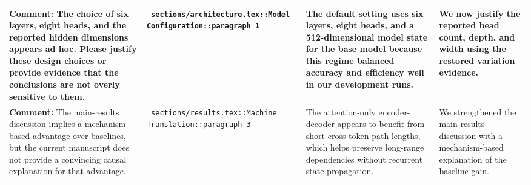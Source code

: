 \documentclass[11pt]{article}
\begin{document}
\begin{longtable}{|p{}|p{}|p{}|p{}|}
\hline
\textbf{ Comment: } The choice of six layers, eight heads, and the reported hidden dimensions appears ad hoc. Please justify these design choices or provide evidence that the conclusions are not overly sensitive to them. & \texttt{ sections/architecture.tex::Model Configuration::paragraph 1 } & {\color{blue}\ttfamily The default setting uses six layers, eight heads, and a 512-dimensional model state for the base model because this regime balanced accuracy and efficiency well in our development runs.} & We now justify the reported head count, depth, and width using the restored variation evidence. \\
\hline
\textbf{ Comment: } The main-results discussion implies a mechanism-based advantage over baselines, but the current manuscript does not provide a convincing causal explanation for that advantage. & \texttt{ sections/results.tex::Machine Translation::paragraph 3 } & {\color{blue}\ttfamily The attention-only encoder-decoder appears to benefit from short cross-token path lengths, which helps preserve long-range dependencies without recurrent state propagation.} & We strengthened the main-results discussion with a mechanism-based explanation of the baseline gain. \\
\hline
\end{longtable}
\end{document}
